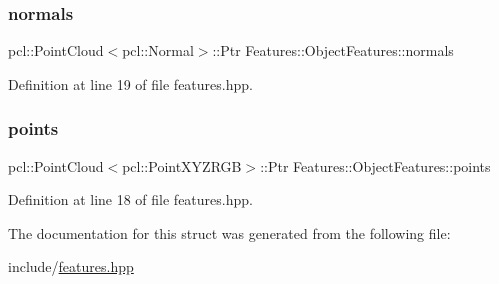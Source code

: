 \subsubsection{\texorpdfstring{normals}{normals}}
{\footnotesize\ttfamily pcl\+::\+Point\+Cloud$<$pcl\+::\+Normal$>$\+::Ptr Features\+::\+Object\+Features\+::normals}



Definition at line 19 of file features.\+hpp.

\hypertarget{struct_features_1_1_object_features_a86f25004593f4c99fd1bbcd3f0d7cf62}{}\label{struct_features_1_1_object_features_a86f25004593f4c99fd1bbcd3f0d7cf62} 
\subsubsection{\texorpdfstring{points}{points}}
{\footnotesize\ttfamily pcl\+::\+Point\+Cloud$<$pcl\+::\+Point\+X\+Y\+Z\+R\+GB$>$\+::Ptr Features\+::\+Object\+Features\+::points}



Definition at line 18 of file features.\+hpp.



The documentation for this struct was generated from the following file\+:\begin{DoxyCompactItemize}
\item 
include/\hyperlink{features_8hpp}{features.\+hpp}\end{DoxyCompactItemize}
